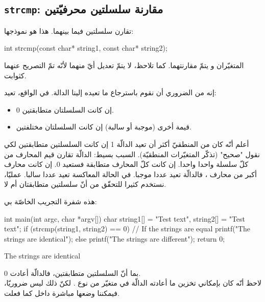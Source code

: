 \subsection{\texttt{strcmp}: مقارنة سلسلتين محرفيّتين}

تقارن سلسلتين فيما بينهما. هذا هو نموذجها:

\begin{Csource}
int strcmp(const char* string1, const char* string2);
\end{Csource}

المتغيّران
و
يتمّ مقارنتهما. كما تلاحظ، لا يتمّ تعديل أيّ منهما لأنّه تمّ التصريح عنهما كثوابت.

إنه من الضروري أن نقوم باسترجاع ما تعيده إلينا الدالة. في الواقع،  تعيد:

\begin{itemize}
  \item 0 إن كانت السلسلتان متطابقتين.
  \item قيمة أخرى (موجبة أو سالبة) إن كانت السلسلتان مختلفتين.
\end{itemize}

\begin{information}
أعلم أنّه كان من المنطقيّ أكثر أن تعيد الدالّة 1 إن كانت السلسلتين متطابقتين لكي نقول "صحيح" (تذكّر المتغيّرات المنطقيّة). السبب بسيط:
الدالّة تقارن قيم المحارف من كلّ سلسلة واحدا واحدا. إن كانت كلّ المحارف متطابقة فستعيد 0. إن كانت محارف
أكبر من محارف
،
فالدالّة تعيد عددا موجبا. في الحالة المعاكسة تعيد عددا سالبا. عمليّا، نستخدم
كثيرا للتحقّق من أنّ سلسلتين متطابقتان أم لا.
\end{information}

هذه شفرة التجريب الخاصّة بي:

\begin{Csource}
int main(int argc, char *argv[])
{
	char string1[] = "Test text", string2[] = "Test text";
	if (strcmp(string1, string2) == 0) // If the strings are equal
	{
    		printf("The strings are identical\n");
 	}
	 else
	{
    		printf("The strings are different\n");
	 }
	return 0;
}
\end{Csource}

\begin{Console}
The strings are identical
\end{Console}

بما أنّ السلسلتين متطابقتين، فالدالّة
أعادت 0.\\
لاحظ أنّه كان بإمكاني تخزين ما أعادته الدالّة في متغيّر من نوع
.
لكنّ ذلك ليس ضروريّا، فيمكننا وضعها مباشرة داخل
كما فعلت.

